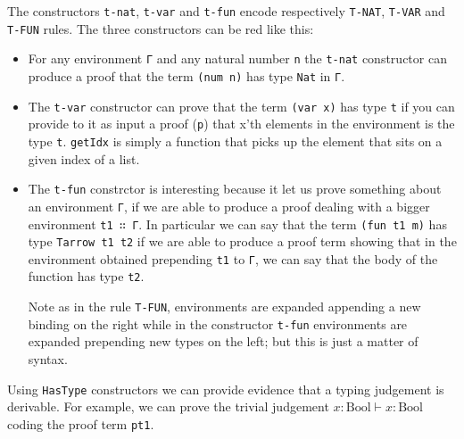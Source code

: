\documentclass{article}
\begin{document}
The constructors \texttt{t-nat}, \texttt{t-var} and \texttt{t-fun} encode respectively \texttt{T-NAT}, \texttt{T-VAR} and \texttt{T-FUN} rules.
The three constructors can be red like this:
\begin{itemize}

\item For any environment \texttt{Γ} and any natural number \texttt{n} the \texttt{t-nat} constructor can produce a proof that the term \texttt{(num n)} has type \texttt{Nat} in \texttt{Γ}.

\item The \texttt{t-var} constructor can prove that the term \texttt{(var x)} has type \texttt{t} if you can provide to it as input a proof (\texttt{p}) that x'th elements in the environment is the type \texttt{t}.
\texttt{getIdx} is simply a function that picks up the element that sits on a given index of a list.

\item The \texttt{t-fun} constrctor is interesting because it let us prove something about an environment \texttt{Γ}, if we are able to produce a proof dealing with a bigger environment \texttt{t1 ∷ Γ}.
In particular we can say that the term \texttt{(fun t1 m)} has type \texttt{Tarrow t1 t2} if we are able to produce a proof term showing that in the environment obtained prepending \texttt{t1} to \texttt{Γ}, we can say that the body of the function has type \texttt{t2}.

Note as in the rule \texttt{T-FUN}, environments are expanded appending a new binding on the right while in the constructor \texttt{t-fun} environments are expanded prepending new types on the left; but this is just a matter of syntax.

\end{itemize}


Using \texttt{HasType} constructors we can provide evidence that a typing judgement is derivable.
For example, we can prove the trivial judgement $x : \text{Bool} \vdash x : \text{Bool}$ coding the proof term \texttt{pt1}.
\end{document}
